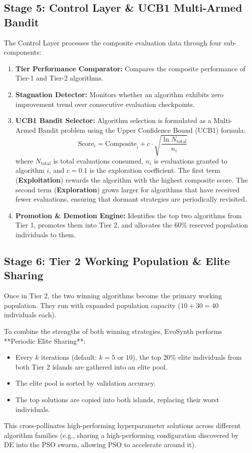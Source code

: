 \documentclass[conference]{IEEEtran}
\begin{document}
\subsection{Stage 5: Control Layer & UCB1 Multi-Armed Bandit}
The Control Layer processes the composite evaluation data through four sub-components:
\begin{enumerate}
    \item \textbf{Tier Performance Comparator:} Compares the composite performance of Tier-1 and Tier-2 algorithms.
    \item \textbf{Stagnation Detector:} Monitors whether an algorithm exhibits zero improvement trend over consecutive evaluation checkpoints.
    \item \textbf{UCB1 Bandit Selector:} Algorithm selection is formulated as a Multi-Armed Bandit problem using the Upper Confidence Bound (UCB1) formula:
    \begin{equation}
    \text{Score}_i = \text{Composite}_i + c \cdot \sqrt{\frac{\ln N_{\text{total}}}{n_i}}
    \end{equation}
    where $N_{\text{total}}$ is total evaluations consumed, $n_i$ is evaluations granted to algorithm $i$, and $c = 0.1$ is the exploration coefficient.
    The first term (\textbf{Exploitation}) rewards the algorithm with the highest composite score. The second term (\textbf{Exploration}) grows larger for algorithms that have received fewer evaluations, ensuring that dormant strategies are periodically revisited.
    \item \textbf{Promotion \& Demotion Engine:} Identifies the top two algorithms from Tier 1, promotes them into Tier 2, and allocates the 60\% reserved population individuals to them.
\end{enumerate}

\subsection{Stage 6: Tier 2 Working Population & Elite Sharing}
Once in Tier 2, the two winning algorithms become the primary working population. They run with expanded population capacity ($10 + 30 = 40$ individuals each).

To combine the strengths of both winning strategies, EvoSynth performs **Periodic Elite Sharing**:
\begin{itemize}
    \item Every $k$ iterations (default: $k = 5$ or $10$), the top 20\% elite individuals from both Tier 2 islands are gathered into an elite pool.
    \item The elite pool is sorted by validation accuracy.
    \item The top solutions are copied into both islands, replacing their worst individuals.
\end{itemize}
This cross-pollinates high-performing hyperparameter solutions across different algorithm families (e.g., sharing a high-performing configuration discovered by DE into the PSO swarm, allowing PSO to accelerate around it).
\end{document}
